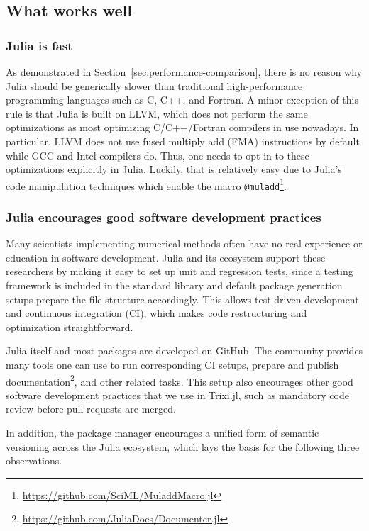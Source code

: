 \documentclass{juliacon}
\newcommand{\trixi}{Trixi.jl\xspace}
\begin{document}
\subsection{What works well}

\subsubsection{Julia is fast}

As demonstrated in Section~\ref{sec:performance-comparison}, there is no reason
why Julia should be generically slower than traditional high-performance programming
languages such as C, C++, and Fortran. A minor exception of this rule is that
Julia is built on LLVM, which does not perform the same optimizations as most
optimizing C/C++/Fortran compilers in use nowadays. In particular, LLVM does
not use fused multiply add (FMA) instructions by default while GCC and Intel
compilers do. Thus, one needs to opt-in to these optimizations explicitly in
Julia. Luckily, that is relatively easy due to Julia's code manipulation
techniques which enable the macro \lstinline{@muladd}\footnote{\url{https://github.com/SciML/MuladdMacro.jl}}.

\subsubsection{Julia encourages good software development practices}

Many scientists implementing numerical methods often have no real experience or
education in software development. Julia and its ecosystem support these
researchers by making it easy to set up unit and regression tests, since a
testing framework is included in the standard library and default package
generation setups prepare the file structure accordingly. This allows test-driven
development and continuous integration (CI), which makes code restructuring
and optimization straightforward.

Julia itself and most packages are developed on GitHub. The community provides
many tools one can use to run corresponding CI setups, prepare and publish
documentation\footnote{\url{https://github.com/JuliaDocs/Documenter.jl}},
and other related tasks. This setup also encourages other good software development
practices that we use in \trixi, such as mandatory code review before pull requests
are merged.

In addition, the package manager encourages a unified form of semantic versioning
across the Julia ecosystem, which lays the basis for the following three
observations.
\end{document}
